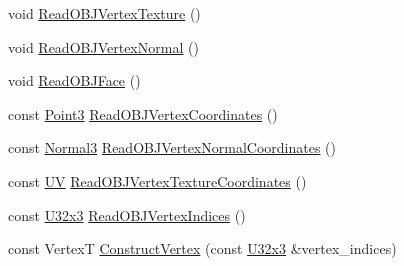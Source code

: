 \begin{DoxyCompactItemize}
void \mbox{\hyperlink{classmage_1_1rendering_1_1loader_1_1_o_b_j_reader_a91f53fd761c83c4135a3ef1882b8300d}{Read\+O\+B\+J\+Vertex\+Texture}} ()
\item 
void \mbox{\hyperlink{classmage_1_1rendering_1_1loader_1_1_o_b_j_reader_a1aafeda3894017fb9b3c6183ac272a34}{Read\+O\+B\+J\+Vertex\+Normal}} ()
\item 
void \mbox{\hyperlink{classmage_1_1rendering_1_1loader_1_1_o_b_j_reader_a58d5c4e4a5a82714567413b6e17a9ec7}{Read\+O\+B\+J\+Face}} ()
\item 
const \mbox{\hyperlink{structmage_1_1_point3}{Point3}} \mbox{\hyperlink{classmage_1_1rendering_1_1loader_1_1_o_b_j_reader_a2c5d954441d64b982d7a89df9171edbc}{Read\+O\+B\+J\+Vertex\+Coordinates}} ()
\item 
const \mbox{\hyperlink{structmage_1_1_normal3}{Normal3}} \mbox{\hyperlink{classmage_1_1rendering_1_1loader_1_1_o_b_j_reader_aa91768722fd418aeba3f12915e8e1525}{Read\+O\+B\+J\+Vertex\+Normal\+Coordinates}} ()
\item 
const \mbox{\hyperlink{structmage_1_1_u_v}{UV}} \mbox{\hyperlink{classmage_1_1rendering_1_1loader_1_1_o_b_j_reader_a3fdbcdecf40525631afc53ce6a6dba45}{Read\+O\+B\+J\+Vertex\+Texture\+Coordinates}} ()
\item 
const \mbox{\hyperlink{namespacemage_a03e3b6f65630005f43a3112d1f6cf57b}{U32x3}} \mbox{\hyperlink{classmage_1_1rendering_1_1loader_1_1_o_b_j_reader_adf0996ca5d0339782382b46c14768b7f}{Read\+O\+B\+J\+Vertex\+Indices}} ()
\item 
const VertexT \mbox{\hyperlink{classmage_1_1rendering_1_1loader_1_1_o_b_j_reader_aa223ad518d2cdddd1c89a3f113356d77}{Construct\+Vertex}} (const \mbox{\hyperlink{namespacemage_a03e3b6f65630005f43a3112d1f6cf57b}{U32x3}} \&vertex\+\_\+indices)
\end{DoxyCompactItemize}
